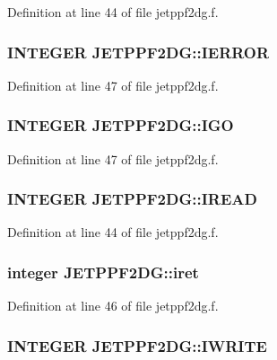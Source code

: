 Definition at line 44 of file jetppf2dg.f.\hypertarget{namespaceJETPPF2DG_7d9dd11fba52d0b1b824c1d55e435c0f}{
\subsubsection[IERROR]{\setlength{\rightskip}{0pt plus 5cm}INTEGER {\bf JETPPF2DG::IERROR}}}
\label{namespaceJETPPF2DG_7d9dd11fba52d0b1b824c1d55e435c0f}




Definition at line 47 of file jetppf2dg.f.\hypertarget{namespaceJETPPF2DG_6fcf8fd1ddd7d7d89f9ebc42bb0acd4d}{
\subsubsection[IGO]{\setlength{\rightskip}{0pt plus 5cm}INTEGER {\bf JETPPF2DG::IGO}}}
\label{namespaceJETPPF2DG_6fcf8fd1ddd7d7d89f9ebc42bb0acd4d}




Definition at line 47 of file jetppf2dg.f.\hypertarget{namespaceJETPPF2DG_5493047f501721b44b5e923dc3cd64d0}{
\subsubsection[IREAD]{\setlength{\rightskip}{0pt plus 5cm}INTEGER {\bf JETPPF2DG::IREAD}}}
\label{namespaceJETPPF2DG_5493047f501721b44b5e923dc3cd64d0}




Definition at line 44 of file jetppf2dg.f.\hypertarget{namespaceJETPPF2DG_8a10d0fb8a6fcf0b1735d5264e4074c6}{
\subsubsection[iret]{\setlength{\rightskip}{0pt plus 5cm}integer {\bf JETPPF2DG::iret}}}
\label{namespaceJETPPF2DG_8a10d0fb8a6fcf0b1735d5264e4074c6}




Definition at line 46 of file jetppf2dg.f.\hypertarget{namespaceJETPPF2DG_ab53f9bbac5ae7882b6288685910c67f}{
\subsubsection[IWRITE]{\setlength{\rightskip}{0pt plus 5cm}INTEGER {\bf JETPPF2DG::IWRITE}}}
\label{namespaceJETPPF2DG_ab53f9bbac5ae7882b6288685910c67f}




